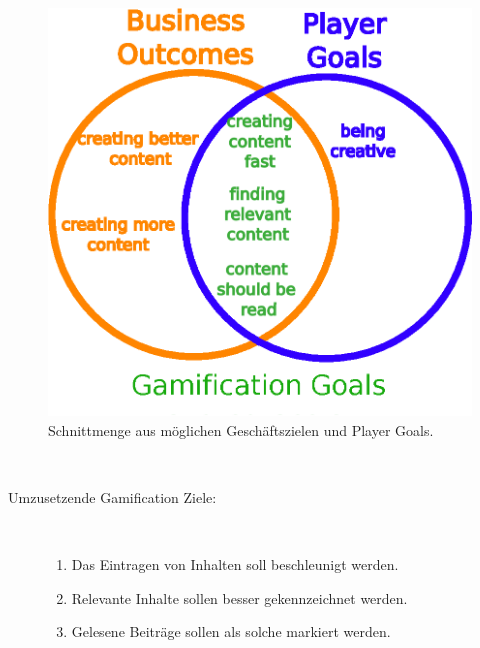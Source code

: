 \documentclass[a4paper,12pt,twoside]{scrartcl}
\begin{document}
\\\\
\begin{figure}[h!]
\begin{center}
\includegraphics[scale = 0.9]{Bilder/Schnittmenge3.eps}
\caption{Schnittmenge aus möglichen Geschäftszielen und Player Goals.}
\label{Schnittmenge}
\end{center}
\end{figure}
\\
\begin{description}
   \item[Umzusetzende Gamification Ziele:]~\par
   \begin{enumerate}
      \item Das Eintragen von Inhalten soll beschleunigt werden. 
      \item Relevante Inhalte sollen besser gekennzeichnet werden.
      \item Gelesene Beiträge sollen als solche markiert werden.
   \end{enumerate}
\end{description} 
\end{document}
